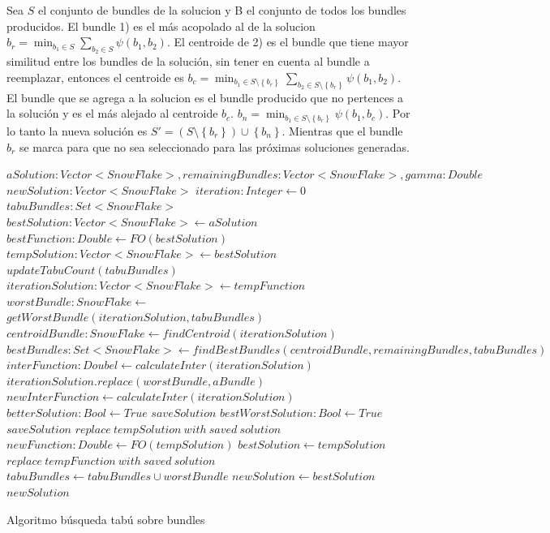 Sea $S$ el conjunto de bundles de la solucion y B el conjunto de todos los bundles producidos. El bundle 1) es el más acopolado al de la solucion $b_r = \min_{b_1 \in S}{\sum_{b_2 \in S}{\psi(b_1,b_2)}}$. El centroide de 2) es el bundle que tiene mayor similitud entre los bundles de la solución, sin tener en cuenta al bundle a reemplazar, entonces el centroide es $b_c = \min_{b_1 \in S \setminus \left\{b_r\right\}}{\sum_{b_2 \in S \setminus \left\{b_r\right\}}{\psi(b_1,b_2)}}$. El bundle que se agrega a la solucion es el bundle producido que no pertences a la solución y es el más alejado al centroide $b_c$. $b_n = \min_{b_1 \in S \setminus \left\{b_r\right\}}{\psi(b_1,b_c)}$. Por lo tanto la nueva solución es $S' = (S \setminus \left\{b_r\right\}) \cup \left\{b_n\right\}$. Mientras que el bundle $b_r$ se marca para que no sea seleccionado para las próximas soluciones generadas.
\begin{algorithm}[H]
\begin{algorithmic}[1]
\REQUIRE $aSolution: Vector<SnowFlake>, remainingBundles: Vector<SnowFlake>, gamma: Double$
\ENSURE $newSolution:Vector<SnowFlake>$
\STATE $iteration:Integer \leftarrow 0$
\STATE $tabuBundles: Set<SnowFlake>$
\STATE $bestSolution: Vector<SnowFlake> \leftarrow aSolution$
\STATE $bestFunction:Double \leftarrow FO(bestSolution)$
\STATE $tempSolution: Vector<SnowFlake> \leftarrow bestSolution$
  \STATE $updateTabuCount(tabuBundles)$
  \STATE $iterationSolution: Vector<SnowFlake> \leftarrow tempFunction$
  \STATE $worstBundle: SnowFlake \leftarrow$\\
  $getWorstBundle(iterationSolution, tabuBundles)$
  \STATE $centroidBundle: SnowFlake \leftarrow findCentroid(iterationSolution)$
  \STATE $bestBundles: Set<SnowFlake> \leftarrow findBestBundles(centroidBundle, remainingBundles, tabuBundles)$
  \STATE $interFunction: Doubel \leftarrow calculateInter(iterationSolution)$
    \STATE $iterationSolution.replace(worstBundle, aBundle)$
    \STATE $newInterFunction \leftarrow calculateInter(iterationSolution)$
      \STATE $betterSolution: Bool \leftarrow True$
      \STATE $saveSolution$
    \ELSE
        \STATE $bestWorstSolution: Bool \leftarrow True$
        \STATE $saveSolution$
      \ENDIF
    \ENDIF
  \ENDFOR
    \STATE $replace\ tempSolution\ with\ saved\ solution$
    \STATE $newFunction: Double \leftarrow FO(tempSolution)$
      \STATE $bestSolution \leftarrow tempSolution$
    \ENDIF
  \ELSE
      \STATE $replace\ tempFunction\ with\ saved\ solution$
    \ENDIF
  \ENDIF
  \STATE $tabuBundles \leftarrow tabuBundles \cup {worstBundle}$
\ENDWHILE
\STATE $newSolution \leftarrow bestSolution$
\RETURN $newSolution$
\end{algorithmic}
\caption{Algoritmo búsqueda tabú sobre bundles}\label{alg:algBusTabuBundle}
\end{algorithm}

